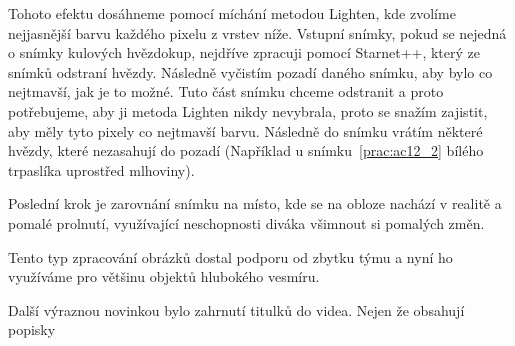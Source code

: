 \documentclass[12pt,a4paper,titlepage]{article}
\begin{document}
Tohoto efektu dosáhneme pomocí míchání metodou Lighten, kde zvolíme nejjasnější barvu každého pixelu z vrstev níže. Vstupní snímky, pokud se nejedná o snímky kulových hvězdokup, nejdříve zpracuji pomocí Starnet++, který ze snímků odstraní hvězdy. Následně vyčistím pozadí daného snímku, aby bylo co nejtmavší, jak je to možné. Tuto část snímku chceme odstranit a proto potřebujeme, aby ji metoda Lighten nikdy nevybrala, proto se snažím zajistit, aby měly tyto pixely co nejtmavší barvu. Následně do snímku vrátím některé hvězdy, které nezasahují do pozadí (Například u snímku~\ref{prac:ac12_2} bílého trpaslíka uprostřed mlhoviny).

Poslední krok je zarovnání snímku na místo, kde se na obloze nachází v realitě a pomalé prolnutí, využívající neschopnosti diváka všimnout si pomalých změn.

Tento typ zpracování obrázků dostal podporu od zbytku týmu a nyní ho využíváme pro většinu objektů hlubokého vesmíru.

Další výraznou novinkou bylo zahrnutí titulků do videa. Nejen že obsahují popisky
\end{document}
